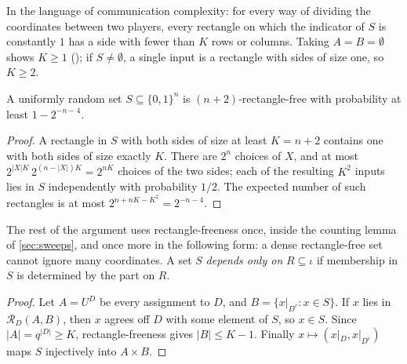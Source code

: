 \documentclass[11pt]{article}
\newcommand{\leanrefs}[1]{{\unskip\nobreak\hfil\penalty50\hskip1em\null\nobreak\hfil
  {\normalfont\small #1}\parfillskip=0pt\finalhyphendemerits=0\par}}
\newcommand{\leanref}[1]{\leanrefs{\lean{#1}}}
\theoremstyle{plain}
\theoremstyle{definition}
\theoremstyle{remark}
\newcommand{\rect}{\mathcal{R}}
\newcommand{\restr}[2]{#1|_{#2}}
\newcommand{\card}[1]{\lvert #1\rvert}
\begin{document}
In the language of communication complexity: for every way of dividing the coordinates between
two players, every rectangle on which the indicator of $S$ is constantly $1$ has a side with
fewer than $K$ rows or columns. Taking $A = B = \emptyset$ shows $K \ge 1$
(); if $S \ne \emptyset$, a single input is a rectangle with
sides of size one, so $K \ge 2$.

\begin{proposition}
\label{prop:random}
A uniformly random set $S \subseteq \{0,1\}^n$ is $(n+2)$-rectangle-free with probability at
least $1 - 2^{-n-4}$.
\end{proposition}

\begin{proof}
A rectangle in $S$ with both sides of size at least $K = n+2$ contains one with both sides of
size exactly $K$. There are $2^n$ choices of $X$, and at most $2^{\card X K}\,2^{(n - \card X)K}
= 2^{nK}$ choices of the two sides; each of the resulting $K^2$ inputs lies in $S$ independently
with probability $1/2$. The expected number of such rectangles is at most
$2^{n + nK - K^2} = 2^{-n-4}$.
\end{proof}

The rest of the argument uses rectangle-freeness once, inside the counting lemma of
\cref{sec:sweeps}, and once more in the following form: a dense rectangle-free set cannot
ignore many coordinates. A set $S$ \emph{depends only on} $R \subseteq \iota$ if membership in
$S$ is determined by the part on $R$.


\begin{proof}
Let $A = U^D$ be every assignment to $D$, and $B = \{\restr{x}{D^c} : x \in S\}$. If $x$ lies in
$\rect_D(A, B)$, then $x$ agrees off $D$ with some element of $S$, so $x \in S$. Since
$\card A = q^{\card D} \ge K$, rectangle-freeness gives $\card B \le K - 1$. Finally
$x \mapsto (\restr{x}{D}, \restr{x}{D^c})$ maps $S$ injectively into $A \times B$.
\end{proof}

\end{document}
